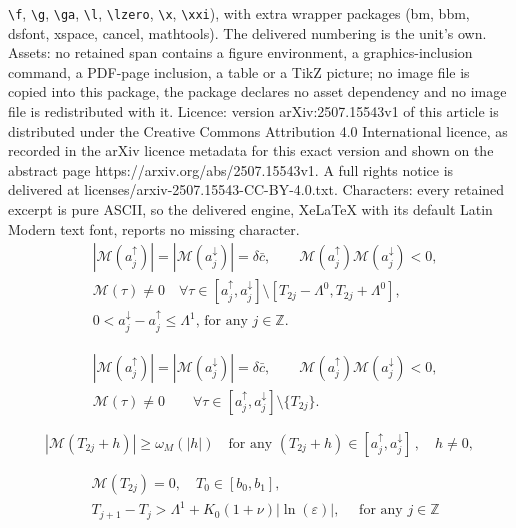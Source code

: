 \documentclass[10pt,a4paper]{amsart}
\def\MM{{\mathcal M}}
\def\Z{{\mathbb Z}}
\def\adown{a^{\downarrow}}
\def\aup{a^{\uparrow}}
\def\dd{\delta}
\def\ep{\varepsilon}
\def\l1{\Lambda^{1}}
\def\lzero{\Lambda^0}
\begin{document}
\texttt{\textbackslash f}, \texttt{\textbackslash g}, \texttt{\textbackslash ga}, \texttt{\textbackslash l}, \texttt{\textbackslash lzero}, \texttt{\textbackslash x}, \texttt{\textbackslash xxi}), with extra wrapper packages (bm, bbm, dsfont, xspace, cancel, mathtools). The delivered numbering is the unit's own. Assets: no retained span contains a figure environment, a graphics-inclusion command, a PDF-page inclusion, a table or a TikZ picture; no image file is copied into this package, the package declares no asset dependency and no image file is redistributed with it. Licence: version arXiv:2507.15543v1 of this article is distributed under the Creative Commons Attribution 4.0 International licence, as recorded in the arXiv licence metadata for this exact version and shown on the abstract page https://arxiv.org/abs/2507.15543v1. A full rights notice is delivered at licenses/arxiv-2507.15543-CC-BY-4.0.txt. Characters: every retained excerpt is pure ASCII, so the delivered engine, XeLaTeX with its default Latin Modern text font, reports no missing character.
\begin{equation}\label{minimal}
\begin{split}
 & |\MM(\aup_j)|=|\MM(\adown_j)|= \dd \bar{c}, \qquad \MM(\aup_j) \MM(\adown_j) <0, \\ & \MM(\tau) \ne 0 \quad \forall \tau \in [\aup_j,
  \adown_j] \setminus [T_{2j}-\lzero, T_{2j}+\lzero],\\
  & \textrm{$0<\adown_j-\aup_j \le \l1$,
for any $j \in \Z$.}
  \end{split}
\end{equation}

  \begin{equation}\label{defbetaj}
\begin{split}
    &  |\MM(\aup_j)|=|\MM(\adown_j)|= \dd \bar{c}, \qquad \MM(\aup_j) \MM(\adown_j) <0, \\
     & \MM(\tau) \ne 0 \qquad \forall \tau \in [\aup_j,
  \adown_j] \setminus \{T_{2j} \}.
\end{split}
\end{equation}

\begin{equation}\label{isolated}
  |\MM(T_{2j}+ h)| \ge \omega_M(|h|)  \quad  \textrm{for any }  (T_{2j}+ h)\in [\aup_j, \adown_j]\, , \quad h \ne 0,
\end{equation}

\begin{equation}\label{TandKnu}
\begin{split}
  &  \MM(T_{2j})=0, \quad T_0 \in [b_0,b_1],\\
& T_{j+1}-T_j > \l1 + K_0 (1+\nu) |\ln(\ep)| ,   \quad \textrm{ for any $j \in \Z$}
  \end{split}
\end{equation}
\end{document}
